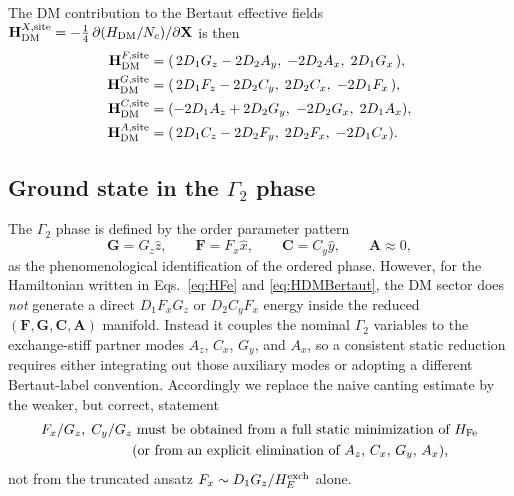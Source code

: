 \documentclass[reprint,amsmath,amssymb,aps,prb,longbibliography]{revtex4-2}
\newcommand{\bfH}{\mathbf{H}}
\newcommand{\bfF}{\mathbf{F}}
\newcommand{\bfG}{\mathbf{G}}
\newcommand{\bfA}{\mathbf{A}}
\newcommand{\bfC}{\mathbf{C}}
\newcommand{\bfX}{\mathbf{X}}
\begin{document}
The DM contribution to the Bertaut effective fields
$\bfH^{X,\rm site}_{\rm DM} = -\tfrac14\,\partial(H_{\rm DM}/N_c)/\partial\bfX$
is then
\begin{equation}
\begin{aligned}
\bfH^{F,{\rm site}}_{\rm DM} &= (\,2D_1G_z - 2D_2A_y,\;-2D_2A_x,\;2D_1G_x\,),\\
\bfH^{G,{\rm site}}_{\rm DM} &= (\,2D_1F_z - 2D_2C_y,\;2D_2C_x,\;-2D_1F_x\,),\\
\bfH^{C,{\rm site}}_{\rm DM} &= (-2D_1A_z + 2D_2G_y,\;-2D_2G_x,\;2D_1A_x),\\
\bfH^{A,{\rm site}}_{\rm DM} &= (\,2D_1C_z - 2D_2F_y,\;2D_2F_x,\;-2D_1C_x).
\end{aligned}
\label{eq:HDMexplicit}
\end{equation}

\subsection{Ground state in the \texorpdfstring{$\Gamma_2$}{Gamma2} phase}
\label{sec:Gamma2GS}

The $\Gamma_2$ phase is defined by the order parameter pattern
\begin{equation}
\bfG = G_z\hat z,\qquad
\bfF = F_x\hat x,\qquad
\bfC = C_y\hat y,\qquad
\bfA \approx 0,
\label{eq:Gamma2OP}
\end{equation}
as the phenomenological identification of the ordered phase. However,
for the Hamiltonian written in Eqs.~\eqref{eq:HFe} and
\eqref{eq:HDMBertaut}, the DM sector does \emph{not} generate a direct
$D_1F_xG_z$ or $D_2C_yF_x$ energy inside the reduced
$(\bfF,\bfG,\bfC,\bfA)$ manifold. Instead it couples the nominal
$\Gamma_2$ variables to the exchange-stiff partner modes
$A_z$, $C_x$, $G_y$, and $A_x$, so a consistent static reduction
requires either integrating out those auxiliary modes or adopting a
different Bertaut-label convention. Accordingly we replace the naive
canting estimate by the weaker, but correct, statement
\begin{equation}
\begin{aligned}
F_x/G_z,\; C_y/G_z
&\text{ must be obtained from a full static minimization of }H_{\rm Fe}\\
&\text{(or from an explicit elimination of }A_z,\,C_x,\,G_y,\,A_x\text{),}
\end{aligned}
\label{eq:cantingangles}
\end{equation}
not from the truncated ansatz $F_x\sim D_1G_z/H_E^{\rm exch}$ alone.
\end{document}

